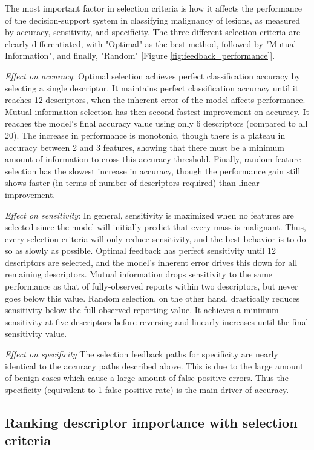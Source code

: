 The most important factor in selection criteria is how it affects the performance of the decision-support system in classifying malignancy of lesions, as measured by accuracy, sensitivity, and specificity.
The three different selection criteria are clearly differentiated, with "Optimal" as the best method, followed by "Mutual Information", and finally, "Random" [Figure \ref{fig:feedback_performance}].

\emph{Effect on accuracy}: 
Optimal selection achieves perfect classification accuracy by selecting a single descriptor.
It maintains perfect classification accuracy until it reaches 12 descriptors, when the inherent error of the model affects performance.
Mutual information selection has then second fastest improvement on accuracy.
It reaches the model's final accuracy value using only 6 descriptors (compared to all 20).
The increase in performance is monotonic, though there is a plateau in accuracy between 2 and 3 features, showing that there must be a minimum amount of information to cross this accuracy threshold.
Finally, random feature selection has the slowest increase in accuracy, though the performance gain still shows faster (in terms of number of descriptors required) than linear improvement.

\emph{Effect on sensitivity}:
In general, sensitivity is maximized when no features are selected since the model will initially predict that every mass is malignant.
Thus, every selection criteria will only reduce sensitivity, and the best behavior is to do so as slowly as possible.
Optimal feedback has perfect sensitivity until 12 descriptors are selected, and the model's inherent error drives this down for all remaining descriptors.
Mutual information drops sensitivity to the same performance as that of fully-observed reports within two descriptors, but never goes below this value.
Random selection, on the other hand, drastically reduces sensitivity below the full-observed reporting value.
It achieves a minimum sensitivity at five descriptors before reversing and linearly increases until the final sensitivity value.

\emph{Effect on specificity}
The selection feedback paths for specificity are nearly identical to the accuracy paths described above.
This is due to the large amount of benign cases which cause a large amount of false-positive errors.
Thus the specificity (equivalent to 1-false positive rate) is the main driver of accuracy.


\subsection{Ranking descriptor importance with selection criteria}

